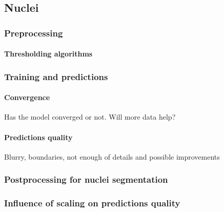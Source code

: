 \subsection{Nuclei}
    \subsubsection{Preprocessing}
        
        \paragraph{Thresholding algorithms}
        
    \subsubsection{Training and predictions}
        \paragraph{Convergence}
              Has the model converged or not. Will more data help?
              
        \paragraph{Predictions quality}
              Blurry, boundaries, not enough of details and possible improvements
              
    \subsubsection{Postprocessing for nuclei segmentation}
        
    \subsubsection{Influence of scaling on predictions quality}
        
